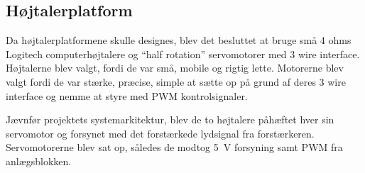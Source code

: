 \subsection{Højtalerplatform}
Da højtalerplatformene skulle designes, blev det besluttet at bruge små 4 ohms Logitech computerhøjtalere og ``half rotation'' servomotorer med 3 wire interface. Højtalerne blev valgt, fordi de var små, mobile og rigtig lette. Motorerne blev valgt fordi de var stærke, præcise, simple at sætte op på grund af deres 3 wire interface og nemme at styre med PWM kontrolsignaler.  

Jævnfør projektets systemarkitektur, blev de to højtalere påhæftet hver sin servomotor og forsynet med det forstærkede lydsignal fra forstærkeren. Servomotorerne blev sat op, således de modtog \SI{5}{V} forsyning samt PWM fra anlægsblokken.
